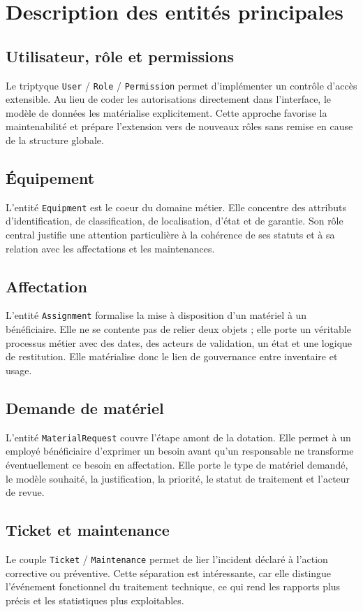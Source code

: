 ﻿\documentclass[12pt,a4paper,oneside]{report}
\begin{document}
\section{Description des entités principales}
\subsection{Utilisateur, rôle et permissions}
Le triptyque \texttt{User} / \texttt{Role} / \texttt{Permission} permet d'implémenter un contrôle d'accès extensible. Au lieu de coder les autorisations directement dans l'interface, le modèle de données les matérialise explicitement. Cette approche favorise la maintenabilité et prépare l'extension vers de nouveaux rôles sans remise en cause de la structure globale.

\subsection{Équipement}
L'entité \texttt{Equipment} est le coeur du domaine métier. Elle concentre des attributs d'identification, de classification, de localisation, d'état et de garantie. Son rôle central justifie une attention particulière à la cohérence de ses statuts et à sa relation avec les affectations et les maintenances.

\subsection{Affectation}
L'entité \texttt{Assignment} formalise la mise à disposition d'un matériel à un bénéficiaire. Elle ne se contente pas de relier deux objets ; elle porte un véritable processus métier avec des dates, des acteurs de validation, un état et une logique de restitution. Elle matérialise donc le lien de gouvernance entre inventaire et usage.

\subsection{Demande de matériel}
L'entité \texttt{MaterialRequest} couvre l'étape amont de la dotation. Elle permet à un employé bénéficiaire d'exprimer un besoin avant qu'un responsable ne transforme éventuellement ce besoin en affectation. Elle porte le type de matériel demandé, le modèle souhaité, la justification, la priorité, le statut de traitement et l'acteur de revue.

\subsection{Ticket et maintenance}
Le couple \texttt{Ticket} / \texttt{Maintenance} permet de lier l'incident déclaré à l'action corrective ou préventive. Cette séparation est intéressante, car elle distingue l'événement fonctionnel du traitement technique, ce qui rend les rapports plus précis et les statistiques plus exploitables.
\end{document}
